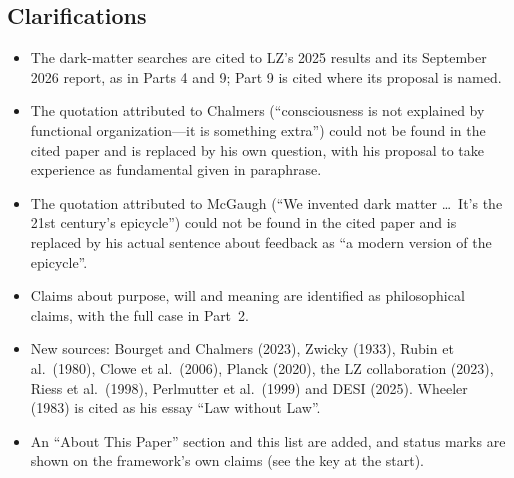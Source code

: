 \documentclass[11pt,a4paper]{article}
\begin{document}
\subsection*{Clarifications}
\begin{itemize}
  \item The dark-matter searches are cited to LZ's 2025 results and its September 2026 report, as in Parts 4 and 9; Part 9 is cited where its proposal is named.
  \item The quotation attributed to Chalmers (``consciousness is not explained by functional organization---it is something extra'') could not be found in the cited paper and is replaced by his own question, with his proposal to take experience as fundamental given in paraphrase.
  \item The quotation attributed to McGaugh (``We invented dark matter \ldots\ It's the 21st century's epicycle'') could not be found in the cited paper and is replaced by his actual sentence about feedback as ``a modern version of the epicycle''.
  \item Claims about purpose, will and meaning are identified as philosophical claims, with the full case in Part~2.
  \item New sources: Bourget and Chalmers (2023), Zwicky (1933), Rubin et al.\ (1980), Clowe et al.\ (2006), Planck (2020), the LZ collaboration (2023), Riess et al.\ (1998), Perlmutter et al.\ (1999) and DESI (2025). Wheeler (1983) is cited as his essay ``Law without Law''.
  \item An ``About This Paper'' section and this list are added, and status marks are shown on the framework's own claims (see the key at the start).
\end{itemize}

\newpage


\end{document}
